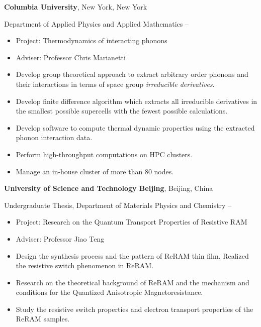 \documentclass[
  a4paper,
  12pt
]{cv}
\begin{document}
{\textbf{Columbia University}},
New York, New York

Department of Applied Physics and Applied Mathematics
\hfill
{} --
\begin{itemize}
\item Project: Thermodynamics of interacting phonons
\item Adviser: Professor Chris Marianetti
\item Develop group theoretical approach to extract arbitrary order phonons and their interactions in terms of space group \emph{irreducible derivatives}.
\item Develop finite difference algorithm which extracts all irreducible derivatives in the smallest possible supercells with the fewest possible calculations.
\item Develop software to compute thermal dynamic properties using the extracted phonon interaction data.
\item Perform high-throughput computations on HPC clusters.
\item Manage an in-house cluster of more than 80 nodes.
\end{itemize}

{\textbf{University of Science and Technology Beijing}},
Beijing, China

Undergraduate Thesis,
Department of Materials Physics and Chemistry
\hfill
{} --
\begin{itemize}
\item Project: Research on the Quantum Transport Properties of Resistive RAM
\item Adviser: Professor Jiao Teng
\item Design the synthesis process and the pattern of ReRAM thin film. Realized the resistive switch phenomenon in ReRAM.
\item Research on the theoretical background of ReRAM and the mechanism and conditions for the Quantized Anisotropic Magnetoresistance.
\item Study the resistive switch properties and electron transport properties of the ReRAM samples.
\end{itemize}
\end{document}

